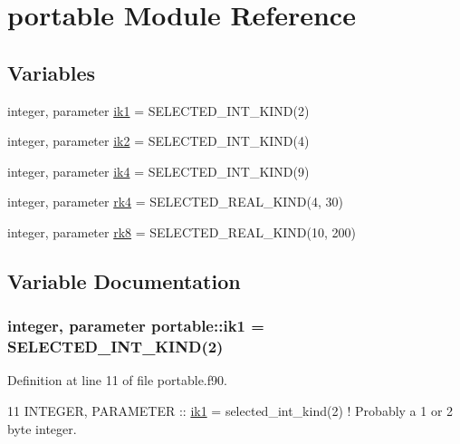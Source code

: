 \hypertarget{namespaceportable}{}\section{portable Module Reference}
\label{namespaceportable}
\subsection*{Variables}
\begin{DoxyCompactItemize}
\item 
integer, parameter \hyperlink{namespaceportable_aaeaca599bf9baead529cbb42680f0f0b}{ik1} = S\+E\+L\+E\+C\+T\+E\+D\+\_\+\+I\+N\+T\+\_\+\+K\+I\+ND(2)
\item 
integer, parameter \hyperlink{namespaceportable_a35a0fbff20f9df8a8a5de95c97dc7d5d}{ik2} = S\+E\+L\+E\+C\+T\+E\+D\+\_\+\+I\+N\+T\+\_\+\+K\+I\+ND(4)
\item 
integer, parameter \hyperlink{namespaceportable_aa110cf333432508140602ea192c4b2ea}{ik4} = S\+E\+L\+E\+C\+T\+E\+D\+\_\+\+I\+N\+T\+\_\+\+K\+I\+ND(9)
\item 
integer, parameter \hyperlink{namespaceportable_abaed22a509442771d3fba69bebda0b33}{rk4} = S\+E\+L\+E\+C\+T\+E\+D\+\_\+\+R\+E\+A\+L\+\_\+\+K\+I\+ND(4, 30)
\item 
integer, parameter \hyperlink{namespaceportable_a609d4b38b4f128b310e288b1861ad9bd}{rk8} = S\+E\+L\+E\+C\+T\+E\+D\+\_\+\+R\+E\+A\+L\+\_\+\+K\+I\+ND(10, 200)
\end{DoxyCompactItemize}


\subsection{Variable Documentation}
\subsubsection[{\texorpdfstring{ik1}{ik1}}]{\setlength{\rightskip}{0pt plus 5cm}integer, parameter portable\+::ik1 = S\+E\+L\+E\+C\+T\+E\+D\+\_\+\+I\+N\+T\+\_\+\+K\+I\+ND(2)}\hypertarget{namespaceportable_aaeaca599bf9baead529cbb42680f0f0b}{}\label{namespaceportable_aaeaca599bf9baead529cbb42680f0f0b}


Definition at line 11 of file portable.\+f90.


\begin{DoxyCode}
11 \textcolor{keywordtype}{INTEGER}, \textcolor{keywordtype}{PARAMETER}  :: \hyperlink{namespaceportable_aaeaca599bf9baead529cbb42680f0f0b}{ik1} = selected\_int\_kind(2)       \textcolor{comment}{! Probably a 1 or 2 byte integer.}
\end{DoxyCode}

